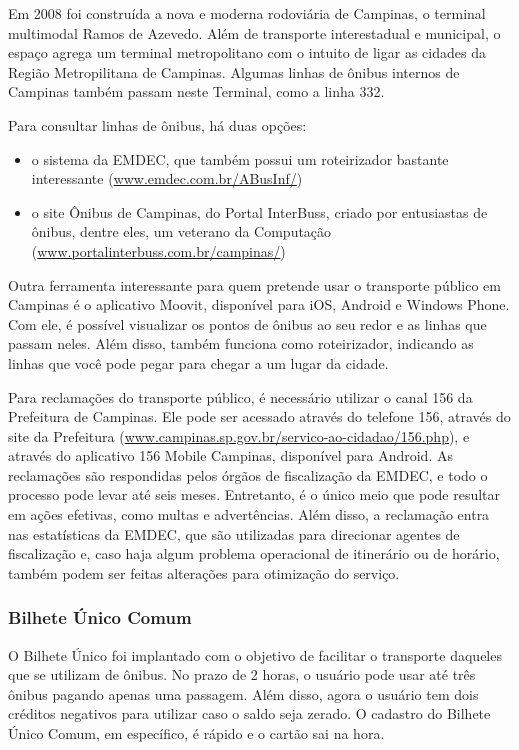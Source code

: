 Em 2008 foi construída a nova e moderna rodoviária de Campinas, o terminal
multimodal Ramos de Azevedo. Além de transporte interestadual e municipal, o
espaço agrega um terminal metropolitano com o intuito de ligar as cidades da
Região Metropilitana de Campinas. Algumas linhas de ônibus internos de Campinas
também passam neste Terminal, como a linha 332.

Para consultar linhas de ônibus, há duas opções:
\begin{itemize}
  \item o sistema da EMDEC, que também possui um roteirizador bastante
interessante (\url{www.emdec.com.br/ABusInf/})
  \item o site Ônibus de Campinas, do Portal InterBuss, criado por entusiastas
de ônibus, dentre eles, um veterano da Computação
(\url{www.portalinterbuss.com.br/campinas/})
\end{itemize}

Outra ferramenta interessante para quem pretende usar o transporte público em
Campinas é o aplicativo Moovit, disponível para iOS, Android e Windows
Phone. Com ele, é possível visualizar os pontos de ônibus ao seu redor e as
linhas que passam neles. Além disso, também funciona como roteirizador,
indicando as linhas que você pode pegar para chegar a um lugar da cidade.

Para reclamações do transporte público, é necessário utilizar o canal 156 da
Prefeitura de Campinas. Ele pode ser acessado através do telefone 156, através
do site da Prefeitura (\url{www.campinas.sp.gov.br/servico-ao-cidadao/156.php}),
e através do aplicativo 156 Mobile Campinas, disponível para Android. As
reclamações são respondidas pelos órgãos de fiscalização da EMDEC, e todo o
processo pode levar até seis meses. Entretanto, é o único meio que pode resultar
em ações efetivas, como multas e advertências. Além disso, a reclamação entra
nas estatísticas da EMDEC, que são utilizadas para direcionar agentes de
fiscalização e, caso haja algum problema operacional de itinerário ou de
horário, também podem ser feitas alterações para otimização do serviço.

\subsubsection{Bilhete Único Comum}

O Bilhete Único foi implantado com o objetivo de facilitar o transporte daqueles
que se utilizam de ônibus. No prazo de 2 horas, o usuário pode usar até três
ônibus pagando apenas uma passagem. Além disso, agora o usuário tem dois
créditos negativos para utilizar caso o saldo seja zerado. O cadastro do
Bilhete Único Comum, em específico, é rápido e o cartão sai na hora.

